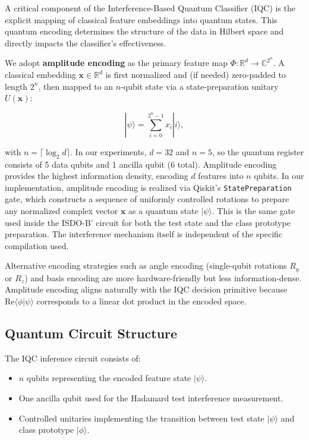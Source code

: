 \documentclass[conference]{IEEEtran}
\begin{document}
A critical component of the Interference-Based Quantum Classifier (IQC) is the explicit mapping of classical feature embeddings into quantum states. This quantum encoding determines the structure of the data in Hilbert space and directly impacts the classifier's effectiveness.

We adopt \textbf{amplitude encoding} as the primary feature map $\Phi: \mathbb{R}^d \rightarrow \mathbb{C}^{2^n}$. A classical embedding $\mathbf{x} \in \mathbb{R}^d$ is first normalized and (if needed) zero-padded to length $2^n$, then mapped to an $n$-qubit state via a state-preparation unitary $U(\mathbf{x})$:

\begin{equation}
|\psi\rangle = \sum_{i=0}^{2^n - 1} x_i |i\rangle,
\end{equation}

with $n = \lceil \log_2 d \rceil$. In our experiments, $d = 32$ and $n = 5$, so the quantum register consists of 5 data qubits and 1 ancilla qubit (6 total). Amplitude encoding provides the highest information density, encoding $d$ features into $n$ qubits. In our implementation, amplitude encoding is realized via Qiskit's \texttt{StatePreparation} gate, which constructs a sequence of uniformly controlled rotations to prepare any normalized complex vector $\mathbf{x}$ as a quantum state $|\psi\rangle$. This is the same gate used inside the ISDO-B' circuit for both the test state and the class prototype preparation. The interference mechanism itself is independent of the specific compilation used.

Alternative encoding strategies such as angle encoding (single-qubit rotations $R_y$ or $R_z$) and basis encoding are more hardware-friendly but less information-dense. Amplitude encoding aligns naturally with the IQC decision primitive because $\mathrm{Re}\langle\phi|\psi\rangle$ corresponds to a linear dot product in the encoded space.

\subsection{Quantum Circuit Structure}

The IQC inference circuit consists of:

\begin{itemize}
    \item $n$ qubits representing the encoded feature state $|\psi\rangle$.
    \item One ancilla qubit used for the Hadamard test interference measurement.
    \item Controlled unitaries implementing the transition between test state $|\psi\rangle$ and class prototype $|\phi\rangle$.
\end{itemize}
\end{document}

